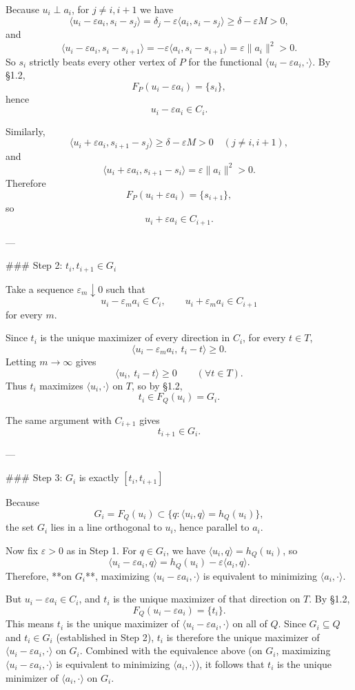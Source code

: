 Because \(u_i\perp a_i\), for \(j\neq i,i+1\) we have
\[
\langle u_i-\varepsilon a_i,s_i-s_j\rangle
=\delta_j-\varepsilon\langle a_i,s_i-s_j\rangle
\ge \delta-\varepsilon M>0,
\]
and
\[
\langle u_i-\varepsilon a_i,s_i-s_{i+1}\rangle
=-\varepsilon\langle a_i,s_i-s_{i+1}\rangle
=\varepsilon\|a_i\|^2>0.
\]
So \(s_i\) strictly beats every other vertex of \(P\) for the functional \(\langle u_i-\varepsilon a_i,\cdot\rangle\). By §1.2,
\[
F_P(u_i-\varepsilon a_i)=\{s_i\},
\]
hence
\[
u_i-\varepsilon a_i\in C_i.
\]

Similarly,
\[
\langle u_i+\varepsilon a_i,s_{i+1}-s_j\rangle\ge \delta-\varepsilon M>0
\quad (j\neq i,i+1),
\]
and
\[
\langle u_i+\varepsilon a_i,s_{i+1}-s_i\rangle
=\varepsilon\|a_i\|^2>0.
\]
Therefore
\[
F_P(u_i+\varepsilon a_i)=\{s_{i+1}\},
\]
so
\[
u_i+\varepsilon a_i\in C_{i+1}.
\]

---

### Step 2: \(t_i,t_{i+1}\in G_i\)

Take a sequence \(\varepsilon_m\downarrow 0\) such that
\[
u_i-\varepsilon_m a_i\in C_i,\qquad u_i+\varepsilon_m a_i\in C_{i+1}
\]
for every \(m\).

Since \(t_i\) is the unique maximizer of every direction in \(C_i\), for every \(t\in T\),
\[
\langle u_i-\varepsilon_m a_i,\ t_i-t\rangle\ge 0.
\]
Letting \(m\to\infty\) gives
\[
\langle u_i,\ t_i-t\rangle\ge 0\qquad(\forall t\in T).
\]
Thus \(t_i\) maximizes \(\langle u_i,\cdot\rangle\) on \(T\), so by §1.2,
\[
t_i\in F_Q(u_i)=G_i.
\]

The same argument with \(C_{i+1}\) gives
\[
t_{i+1}\in G_i.
\]

---

### Step 3: \(G_i\) is exactly \([t_i,t_{i+1}]\)

Because
\[
G_i=F_Q(u_i)\subset \{q:\langle u_i,q\rangle=h_Q(u_i)\},
\]
the set \(G_i\) lies in a line orthogonal to \(u_i\), hence parallel to \(a_i\).

Now fix \(\varepsilon>0\) as in Step 1. For \(q\in G_i\), we have \(\langle u_i,q\rangle=h_Q(u_i)\), so
\[
\langle u_i-\varepsilon a_i,q\rangle=h_Q(u_i)-\varepsilon\langle a_i,q\rangle.
\]
Therefore, **on \(G_i\)**, maximizing \(\langle u_i-\varepsilon a_i,\cdot\rangle\) is equivalent to minimizing \(\langle a_i,\cdot\rangle\).

But \(u_i-\varepsilon a_i\in C_i\), and \(t_i\) is the unique maximizer of that direction on \(T\). By §1.2,
\[
F_Q(u_i-\varepsilon a_i)=\{t_i\}.
\]
This means \(t_i\) is the unique maximizer of \(\langle u_i-\varepsilon a_i,\cdot\rangle\) on all of \(Q\). Since \(G_i\subseteq Q\) and \(t_i\in G_i\) (established in Step 2), \(t_i\) is therefore the unique maximizer of \(\langle u_i-\varepsilon a_i,\cdot\rangle\) on \(G_i\). Combined with the equivalence above (on \(G_i\), maximizing \(\langle u_i-\varepsilon a_i,\cdot\rangle\) is equivalent to minimizing \(\langle a_i,\cdot\rangle\)), it follows that \(t_i\) is the unique minimizer of \(\langle a_i,\cdot\rangle\) on \(G_i\).

